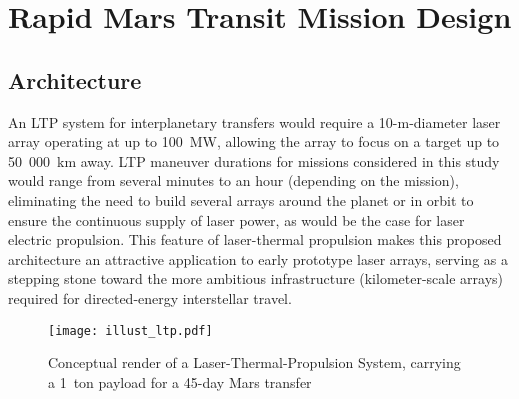\documentclass[final,3p,times,twocolumn,sort&compress, lefttitle]{elsarticle}
\begin{document}
    
    \section{Rapid Mars Transit Mission Design}
        \label{sec:mars1}
        \subsection{Architecture}
            An LTP system for interplanetary transfers would require a 10-m-diameter laser array operating at up to 100~MW, allowing the array to focus on a target up to 50~000~km away. LTP maneuver durations for missions considered in this study would range from several minutes to an hour (depending on the mission), eliminating the need to build several arrays around the planet or in orbit to ensure the continuous supply of laser power, as would be the case for laser electric propulsion. This feature of laser-thermal propulsion makes this proposed architecture an attractive application to early prototype laser arrays, serving as a stepping stone toward the more ambitious infrastructure (kilometer-scale arrays) required for directed-energy interstellar travel.
        
            \begin{figure}[t]
                \centering
                \texttt{[image: illust\_ltp.pdf]}
                \caption{Conceptual render of a Laser-Thermal-Propulsion System, carrying a 1~ton payload for a 45-day Mars transfer}
                \label{fig:ltpRender}
            \end{figure}
            
\end{document}
